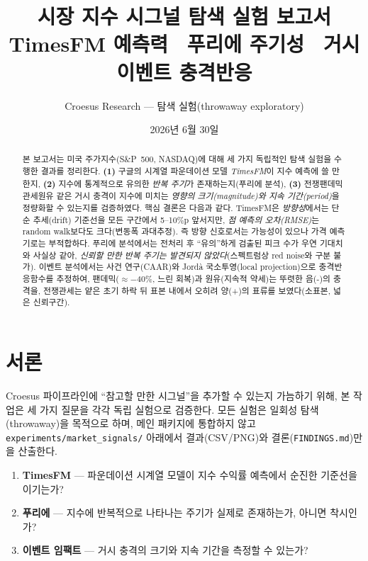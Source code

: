 \documentclass[11pt]{article}
\title{\vspace{-1.2cm}\textbf{시장 지수 시그널 탐색 실험 보고서}\\[4pt]
\large TimesFM 예측력 \textperiodcentered\ 푸리에 주기성 \textperiodcentered\ 거시 이벤트 충격반응}
\author{Croesus Research --- 탐색 실험(throwaway exploratory)}
\date{2026년 6월 30일}
\newcommand{\Jorda}{{\latinfont Jordà}}
\begin{document}
\maketitle
\vspace{-0.6cm}

\begin{abstract}
\noindent
본 보고서는 미국 주가지수(S\&P~500, NASDAQ)에 대해 세 가지 독립적인 탐색 실험을 수행한 결과를 정리한다.
\textbf{(1)} 구글의 시계열 파운데이션 모델 \emph{TimesFM}이 지수 예측에 쓸 만한지,
\textbf{(2)} 지수에 통계적으로 유의한 \emph{반복 주기}가 존재하는지(푸리에 분석),
\textbf{(3)} 전쟁\textperiodcentered 팬데믹\textperiodcentered 관세\textperiodcentered 원유 같은 거시 충격이 지수에 미치는 \emph{영향의 크기(magnitude)와 지속 기간(period)}을 정량화할 수 있는지를 검증하였다.
핵심 결론은 다음과 같다. TimesFM은 \emph{방향성}에서는 단순 추세(drift) 기준선을 모든 구간에서 5--10\%p 앞서지만, \emph{점 예측의 오차(RMSE)}는 random walk보다도 크다(변동폭 과대추정). 즉 방향 신호로서는 가능성이 있으나 가격 예측기로는 부적합하다. 푸리에 분석에서는 전처리 후 ``유의''하게 검출된 피크 수가 우연 기대치와 사실상 같아, \emph{신뢰할 만한 반복 주기는 발견되지 않았다}(스펙트럼상 red noise와 구분 불가). 이벤트 분석에서는 사건 연구(CAAR)와 \Jorda{} 국소투영(local projection)으로 충격반응함수를 추정하여, 팬데믹($\approx-40\%$, 느린 회복)과 원유(지속적 약세)는 뚜렷한 음(-)의 충격을, 전쟁\textperiodcentered 관세는 얕은 초기 하락 뒤 표본 내에서 오히려 양(+)의 표류를 보였다(소표본, 넓은 신뢰구간).
\end{abstract}

\section{서론}

Croesus 파이프라인에 ``참고할 만한 시그널''을 추가할 수 있는지 가늠하기 위해, 본 작업은 세 가지 질문을 각각 독립 실험으로 검증한다. 모든 실험은 일회성 탐색(throwaway)을 목적으로 하며, 메인 패키지에 통합하지 않고 \texttt{experiments/market\_signals/} 아래에서 결과(CSV/PNG)와 결론(\texttt{FINDINGS.md})만을 산출한다.

\begin{enumerate}[label=\textbf{Q\arabic*.}]
  \item \textbf{TimesFM} --- 파운데이션 시계열 모델이 지수 수익률 예측에서 순진한 기준선을 이기는가?
  \item \textbf{푸리에} --- 지수에 반복적으로 나타나는 주기가 실제로 존재하는가, 아니면 착시인가?
  \item \textbf{이벤트 임팩트} --- 거시 충격의 크기와 지속 기간을 측정할 수 있는가?
\end{enumerate}
\end{document}
